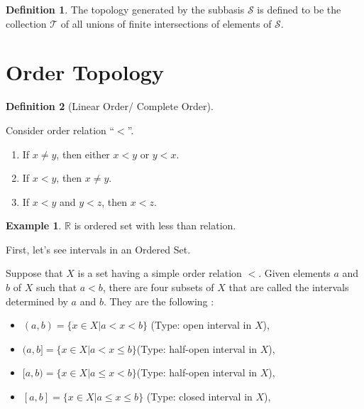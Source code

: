 \documentclass[
]{book}
\providecommand{\tightlist}{%
  \setlength{\itemsep}{0pt}\setlength{\parskip}{0pt}}
\theoremstyle{definition}
\newtheorem{definition}{Definition}[chapter]
\theoremstyle{definition}
\newtheorem{example}{Example}[chapter]
\theoremstyle{definition}
\theoremstyle{definition}
\theoremstyle{remark}
\begin{document}
\begin{definition}
\protect\hypertarget{def:unnamed-chunk-19}{}\label{def:unnamed-chunk-19}The topology generated by the subbasis \(\mathcal{S}\) is defined to be the collection \(\mathcal{T}\) of all unions of finite intersections of elements of \(\mathcal{S}\).
\end{definition}

\hypertarget{order-topology}{%
\section{Order Topology}\label{order-topology}}

\begin{definition}[Linear Order/ Complete Order]
\protect\hypertarget{def:unnamed-chunk-20}{}\label{def:unnamed-chunk-20}

Consider order relation ``\(<\)''.

\begin{enumerate}
\def\labelenumi{\arabic{enumi}.}
\tightlist
\item
  If \(x \neq y\), then either \(x < y\) or \(y < x\).
\item
  If \(x < y\), then \(x\neq y\).
\item
  If \(x < y\) and \(y < z\), then \(x < z\).
\end{enumerate}

\end{definition}

\begin{example}
\protect\hypertarget{exm:unnamed-chunk-21}{}\label{exm:unnamed-chunk-21}\(\mathbb{R}\) is ordered set with less than relation.
\end{example}

First, let's see intervals in an Ordered Set.

Suppose that \(X\) is a set having a simple order relation \(<\). Given elements \(a\) and \(b\)
of \(X\) such that \(a < b\), there are four subsets of \(X\) that are called the intervals determined by \(a\) and \(b\). They are the following :

\begin{itemize}
\tightlist
\item
  \((a, b) = \{x\in X | a < x < b\}\) (Type: open interval in \(X\)),
\item
  \((a, b] = \{x\in X | a < x ≤ b\}\)(Type: half-open interval in \(X\)),
\item
  \([a, b) = \{x\in X | a ≤ x < b\}\)(Type: half-open interval in \(X\)),
\item
  \([a, b] = \{x\in X | a ≤ x ≤ b\}\) (Type: closed interval in \(X\)),
\end{itemize}
\end{document}
